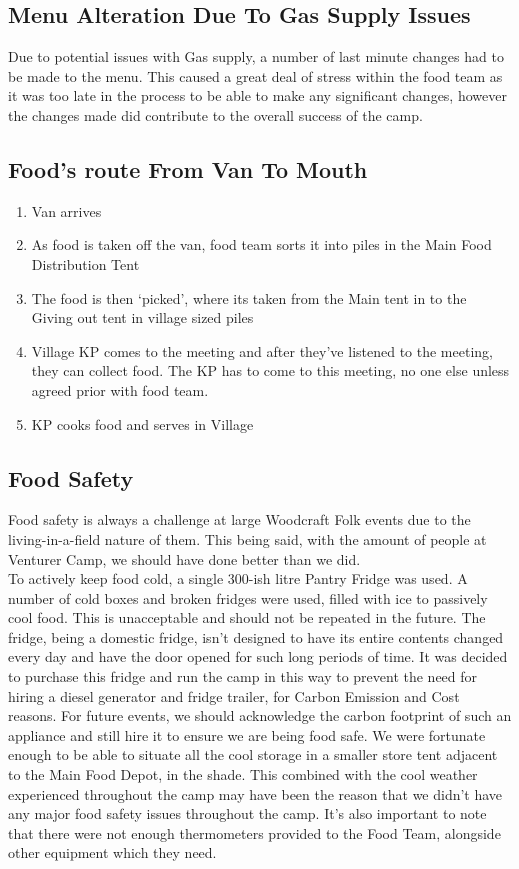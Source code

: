 \subsection{Menu Alteration Due To Gas Supply Issues}
Due to potential issues with Gas supply, a number of last minute changes had to be made to the menu. This caused a great deal of stress within the food team as it was too late in the process to be able to make any significant changes, however the changes made did contribute to the overall success of the camp.
\subsection{Food's route From Van To Mouth}
\begin{enumerate}
    \item Van arrives
    \item As food is taken off the van, food team sorts it into piles in the Main Food Distribution Tent
    \item The food is then `picked', where its taken from the Main tent in to the Giving out tent in village sized piles
    \item Village KP comes to the meeting and after they've listened to the meeting, they can collect food. The KP has to come to this meeting, no one else unless agreed prior with food team.
    \item KP cooks food and serves in Village
\end{enumerate}

\subsection{Food Safety}
Food safety is always a challenge at large Woodcraft Folk events due to the living-in-a-field nature of them. This being said, with the amount of people at Venturer Camp, we should have done better than we did. \\

To actively keep food cold, a single 300-ish litre Pantry Fridge was used. A number of cold boxes and broken fridges were used, filled with ice to passively cool food. This is unacceptable and should not be repeated in the future. The fridge, being a domestic fridge, isn't designed to have its entire contents changed every day and have the door opened for such long periods of time. It was decided to purchase this fridge and run the camp in this way to prevent the need for hiring a diesel generator and fridge trailer, for Carbon Emission and Cost reasons. For future events, we should acknowledge the carbon footprint of such an appliance and still hire it to ensure we are being food safe. We were fortunate enough to be able to situate all the cool storage in a smaller store tent adjacent to the Main Food Depot, in the shade. This combined with the cool weather experienced throughout the camp may have been the reason that we didn't have any major food safety issues throughout the camp. It's also important to note that there were not enough thermometers provided to the Food Team, alongside other equipment which they need. \\

